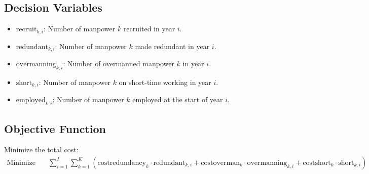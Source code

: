 \documentclass{article}
\begin{document}
\subsection*{Decision Variables}
\begin{itemize}
    \item \( \text{recruit}_{k,i} \): Number of manpower \( k \) recruited in year \( i \).
    \item \( \text{redundant}_{k,i} \): Number of manpower \( k \) made redundant in year \( i \).
    \item \( \text{overmanning}_{k,i} \): Number of overmanned manpower \( k \) in year \( i \).
    \item \( \text{short}_{k,i} \): Number of manpower \( k \) on short-time working in year \( i \).
    \item \( \text{employed}_{k,i} \): Number of manpower \( k \) employed at the start of year \( i \).
\end{itemize}

\subsection*{Objective Function}
Minimize the total cost:
\[
\begin{align*}
\text{Minimize} \quad & \sum_{i=1}^{I} \sum_{k=1}^{K} \left( \text{costredundancy}_k \cdot \text{redundant}_{k,i} + \text{costoverman}_k \cdot \text{overmanning}_{k,i} + \text{costshort}_k \cdot \text{short}_{k,i} \right)
\end{align*}
\]
\end{document}
